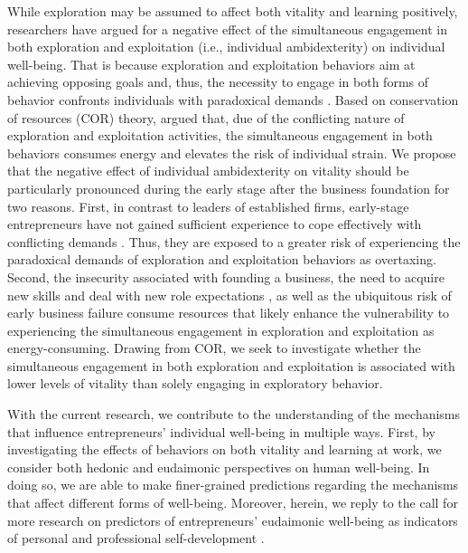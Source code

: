 \documentclass[man, 12pt, a4paper, noextraspace]{apa6}
\begin{document}
While exploration may be assumed to affect both vitality and learning positively, researchers have argued for a negative effect of the simultaneous engagement in both exploration and exploitation (i.e., individual ambidexterity) on individual well-being.
That is because exploration and exploitation behaviors aim at achieving opposing goals and, thus, the necessity to engage in both forms of behavior confronts individuals with paradoxical demands \parencite{Andriopoulos2009, Rosing.2017}.
Based on conservation of resources (COR) theory, \textcite{Hunter2017} argued that, due of the conflicting nature of exploration and exploitation activities, the simultaneous engagement in both behaviors consumes energy and elevates the risk of individual strain. 
We propose that the negative effect of individual ambidexterity on vitality should be particularly pronounced during the early stage after the business foundation for two reasons. 
First, in contrast to leaders of established firms, early-stage entrepreneurs have not gained sufficient experience to cope effectively with conflicting demands \parencite{Uy.2013}. 
Thus, they are exposed to a greater risk of experiencing the paradoxical demands of exploration and exploitation behaviors as overtaxing. 
Second, the insecurity associated with founding a business, the need to acquire new skills and deal with new role expectations \parencite{Wincent2009a}, as well as the ubiquitous risk of early business failure \parencite{Byrne.2015} consume resources that likely enhance the vulnerability to experiencing the simultaneous engagement in exploration and exploitation as energy-consuming. 
Drawing from COR, we seek to investigate whether the simultaneous engagement in both exploration and exploitation is associated with lower levels of vitality than solely engaging in exploratory behavior. \par 

With the current research, we contribute to the understanding of the mechanisms that influence entrepreneurs' individual well-being in multiple ways. 
First, by investigating the effects of behaviors on both vitality and learning at work, we consider both hedonic and eudaimonic perspectives on human well-being.
In doing so, we are able to make finer-grained predictions regarding the mechanisms that affect different forms of well-being.
Moreover, herein, we reply to the call for more research on predictors of entrepreneurs' eudaimonic well-being as indicators of personal and professional self-development \parencite{Stephan2018, Ryff2008}. \par 
\end{document}
